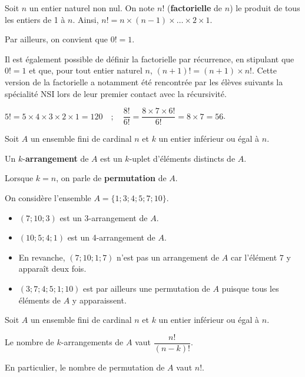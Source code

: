 \documentclass[11pt,fleqn, openany]{book} %
\begin{document}
\begin{definition}Soit $n$ un entier naturel non nul. On note $n!$ (\textbf{factorielle} de $n$) le produit de tous les entiers de 1 à $n$. Ainsi, $n!=n\times (n-1) \times \ldots \times 2 \times 1$.

Par ailleurs, on convient que $0!=1$.\end{definition}

Il est également possible de définir la factorielle par récurrence, en stipulant que $0!=1$ et que, pour tout entier naturel $n$, $(n+1)!=(n+1) \times n!$. Cette version de la factorielle a notamment été rencontrée par les élèves suivants la spécialité NSI lors de leur premier contact avec la récursivité.

\begin{example} $5!=5\times 4 \times 3 \times 2 \times 1 = 120 \quad ;\quad \dfrac{8!}{6!}=\dfrac{8 \times 7 \times 6!}{6!}=8\times 7 = 56$.\end{example}

\begin{definition}Soit $A$ un ensemble fini de cardinal $n$ et $k$ un entier inférieur ou égal à $n$. 

Un $k$-\textbf{arrangement} de $A$ est un $k$-uplet d'éléments distincts de $A$.

Lorsque $k=n$, on parle de \textbf{permutation} de $A$.\end{definition}

\begin{example} On considère l'ensemble $A=\{1;3;4;5;7;10\}$. 
\begin{itemize}
\item $(7;10;3)$ est un 3-arrangement de $A$. 
\item $(10;5;4;1)$ est un 4-arrangement de $A$. 
\item En revanche, $(7;10;1;7)$ n'est pas un arrangement de $A$ car l'élément $7$ y apparaît deux fois. 
\item $(3;7;4;5;1;10)$ est par ailleurs une permutation de $A$ puisque tous les éléments de $A$ y apparaissent.
\end{itemize}\end{example}

 
 \begin{proposition}Soit $A$ un ensemble fini de cardinal $n$ et $k$ un entier inférieur ou égal à $n$. 
 
 Le nombre de $k$-arrangements de $A$ vaut $\dfrac{n!}{(n-k)!}$.
 
 En particulier, le nombre de permutation de $A$ vaut $n!$.\end{proposition}
 
\end{document}

